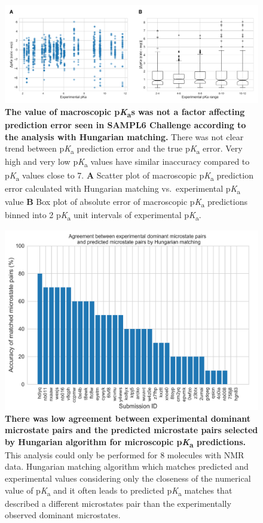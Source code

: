\documentclass[9pt,lineno,final]{elife}
\newcommand{\pKa}{p\textit{K}\textsubscript{a}}
\begin{document}
\begin{figure}
\centering
\includegraphics[width=1.0\linewidth]{figures/typeIII_error_vs_exp_pKa.pdf}
\caption{ {\bf The value of macroscopic \pKa{}s was not a factor affecting prediction error seen in SAMPL6 Challenge according to the analysis with Hungarian matching.} 
There was not clear trend between \pKa{} prediction error and the true \pKa{} error. 
Very high and very low \pKa{} values have similar inaccuracy compared to \pKa{} values close to 7.
{\bf A} Scatter plot of macroscopic \pKa{} prediction error calculated with Hungarian matching vs.\ experimental \pKa{} value {\bf B} Box plot of absolute error of macroscopic \pKa{} predictions binned into 2 \pKa{} unit intervals of experimental \pKa{}.
}
\label{fig:macroscopic-pKa-error-vs-pKa-value}
\end{figure}


\begin{figure}
\centering
\includegraphics[width=0.75\linewidth]{figures/TypeI_Hungarian_match_microstate_pair_accuracy.pdf}
\caption{ {\bf There was low agreement between experimental dominant microstate pairs and the predicted microstate pairs selected by Hungarian algorithm for microscopic \pKa{} predictions.} 
This analysis could only be performed for 8 molecules with NMR data. 
Hungarian matching algorithm which matches predicted and experimental values considering only the closeness of the numerical value of \pKa{} and it often leads to predicted \pKa{} matches that described a different microstates pair than the experimentally observed dominant microstates.
}
\label{fig:microstate-pairs-with-Hungarian-match-vs-experiments}
\end{figure}
\end{document}
